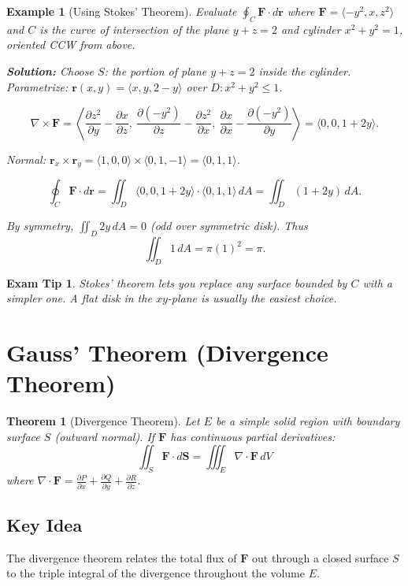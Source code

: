 \documentclass[12pt]{article}
\newcommand{\curl}{\nabla\times}
\newcommand{\divg}{\nabla\cdot}
\newtheorem{theorem}{Theorem}
\newtheorem{example}{Example}[section]
\newtheorem{tip}{Exam Tip}[section]
\begin{document}
\begin{example}[Using Stokes' Theorem]
Evaluate \(\oint_C \mathbf{F}\cdot d\mathbf{r}\) where \(\mathbf{F}=\langle -y^2, x, z^2\rangle\) and \(C\) is the curve of intersection of the plane \(y+z=2\) and cylinder \(x^2+y^2=1\), oriented CCW from above.

\textbf{Solution:} Choose \(S\): the portion of plane \(y+z=2\) inside the cylinder.  
Parametrize: \(\mathbf{r}(x,y)=\langle x, y, 2-y\rangle\) over \(D: x^2+y^2\le 1\).

\[
\curl\mathbf{F} = \left\langle \frac{\partial z^2}{\partial y}-\frac{\partial x}{\partial z},\ \frac{\partial(-y^2)}{\partial z}-\frac{\partial z^2}{\partial x},\ \frac{\partial x}{\partial x}-\frac{\partial(-y^2)}{\partial y}\right\rangle = \langle 0,0,1+2y\rangle.
\]

Normal: \(\mathbf{r}_x\times\mathbf{r}_y = \langle1,0,0\rangle\times\langle0,1,-1\rangle = \langle0,1,1\rangle\).

\[
\oint_C \mathbf{F}\cdot d\mathbf{r} = \iint_D \langle0,0,1+2y\rangle\cdot\langle0,1,1\rangle\,dA = \iint_D (1+2y)\,dA.
\]

By symmetry, \(\iint_D 2y\,dA = 0\) (odd over symmetric disk). Thus
\[
\iint_D 1\,dA = \pi(1)^2 = \pi.
\]
\end{example}

\begin{tip}
Stokes' theorem lets you replace any surface bounded by \(C\) with a simpler one. A flat disk in the \(xy\)-plane is usually the easiest choice.
\end{tip}

\section{Gauss' Theorem (Divergence Theorem)}

\begin{theorem}[Divergence Theorem]
Let \(E\) be a simple solid region with boundary surface \(S\) (outward normal). If \(\mathbf{F}\) has continuous partial derivatives:
\[
\boxed{\iint_S \mathbf{F}\cdot d\mathbf{S} = \iiint_E \divg\mathbf{F}\,dV}
\]
where \(\divg\mathbf{F} = \frac{\partial P}{\partial x}+\frac{\partial Q}{\partial y}+\frac{\partial R}{\partial z}\).
\end{theorem}

\subsection{Key Idea}
The divergence theorem relates the total flux of \(\mathbf{F}\) out through a closed surface \(S\) to the triple integral of the divergence throughout the volume \(E\).
\end{document}
